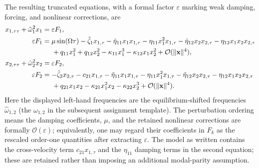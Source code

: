 \documentclass[11pt]{article}
\begin{document}
The resulting truncated equations, with a formal factor $\varepsilon$ marking weak damping, forcing, and nonlinear corrections, are
\begin{align}
x_{1,\tau\tau}+\hat{\omega}_1^2x_1&=\varepsilon F_1,\nonumber\\
\varepsilon F_1&=\mu\sin(\Omega\tau)-\hat{\zeta}_1x_{1,\tau}-\tilde{\eta}_{11}x_1x_{1,\tau}-\eta_{11}x_1^2x_{1,\tau}-\tilde{\eta}_{12}x_2x_{2,\tau}-\eta_{12}x_1x_2x_{2,\tau}\nonumber\\
&\hspace{1.4em}+q_{11}x_1^2+q_{12}x_2^2-\kappa_{11}x_1^3-\kappa_{12}x_1x_2^2+\mathcal{O}(\|\mathbf{x}\|^4),\label{eq:F1-expanded}\\
x_{2,\tau\tau}+\hat{\omega}_2^2x_2&=\varepsilon F_2,\nonumber\\
\varepsilon F_2&=-\hat{\zeta}_2x_{2,\tau}-c_{21}x_{1,\tau}-\tilde{\eta}_{11}x_1x_{1,\tau}-\eta_{11}x_1^2x_{1,\tau}-\tilde{\eta}_{12}x_2x_{2,\tau}-\eta_{12}x_1x_2x_{2,\tau}\nonumber\\
&\hspace{1.4em}+q_{21}x_1x_2-\kappa_{21}x_1^2x_2-\kappa_{22}x_2^3+\mathcal{O}(\|\mathbf{x}\|^4).\label{eq:F2-expanded}
\end{align}
Here the displayed left-hand frequencies are the equilibrium-shifted frequencies $\hat{\omega}_{1,2}$ (the $\omega_{1,2}$ in the subsequent assignment template). The perturbation ordering means the damping coefficients, $\mu$, and the retained nonlinear corrections are formally $\mathcal{O}(\varepsilon)$; equivalently, one may regard their coefficients in $F_k$ as the rescaled order-one quantities after extracting $\varepsilon$. The model as written contains the cross-velocity term $c_{21}x_{1,\tau}$ and the $\eta_{11}$ damping terms in the second equation; these are retained rather than imposing an additional modal-parity assumption.
\end{document}
